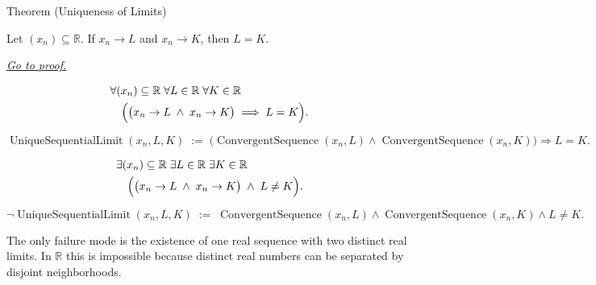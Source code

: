 \begin{theorembox}{Theorem (Uniqueness of Limits)}
\begin{theorem}
\label{thm:uniqueness-of-limits}

Let $(x_n) \subseteq \mathbb{R}$. If $x_n \to L$ and $x_n \to K$, then
$L = K$.

\smallskip
\noindent
\hyperref[prf:uniqueness-of-limits]{\textit{Go to proof.}}
\end{theorem}
\end{theorembox}

\begin{remark*}
\[
\begin{aligned}
&\forall (x_n) \subseteq \mathbb{R} \;\forall L \in \mathbb{R}
\;\forall K \in \mathbb{R}\\
&\quad\Bigl(
    \bigl(x_n \to L \;\land\; x_n \to K\bigr)
    \;\Longrightarrow\;
    L = K
\Bigr).
\end{aligned}
\]
\end{remark*}

\begin{remark*}
\[
\operatorname{UniqueSequentialLimit}(x_n,L,K)
\;:=\;
\bigl(\operatorname{ConvergentSequence}(x_n,L)
\land
\operatorname{ConvergentSequence}(x_n,K)\bigr)
\Longrightarrow L=K.
\]
\end{remark*}

\begin{remark*}
\[
\begin{aligned}
&\exists (x_n) \subseteq \mathbb{R} \;\exists L \in \mathbb{R}
\;\exists K \in \mathbb{R}\\
&\quad\Bigl(
    \bigl(x_n \to L \;\land\; x_n \to K\bigr)
    \;\land\;
    L \neq K
\Bigr).
\end{aligned}
\]
\end{remark*}

\begin{remark*}
\[
\lnot\operatorname{UniqueSequentialLimit}(x_n,L,K)
\;:=\;
\operatorname{ConvergentSequence}(x_n,L)
\land
\operatorname{ConvergentSequence}(x_n,K)
\land L\neq K.
\]
\end{remark*}

\begin{remark*}
The only failure mode is the existence of one real sequence with two
distinct real limits. In $\mathbb{R}$ this is impossible because
distinct real numbers can be separated by disjoint neighborhoods.
\end{remark*}

